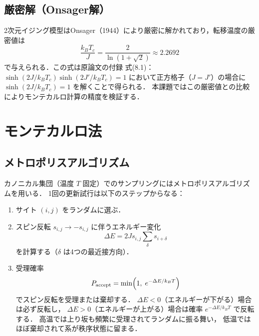 \documentclass[12pt,a4paper]{ltjsarticle}
\begin{document}
\subsection{厳密解（Onsager解）}

2次元イジング模型はOnsager（1944）により厳密に解かれており，転移温度の厳密値は
\begin{equation}
  \frac{k_B T_c}{J} = \frac{2}{\ln(1+\sqrt{2})} \approx 2.2692
  \label{eq:onsager}
\end{equation}
で与えられる．この式は原論文の付録 式(8.1)：$\sinh(2J/k_BT_c)\sinh(2J'/k_BT_c)=1$
において正方格子（$J=J'$）の場合に $\sinh(2J/k_BT_c)=1$ を解くことで得られる．
本課題ではこの厳密値との比較によりモンテカルロ計算の精度を検証する．

\section{モンテカルロ法}

\subsection{メトロポリスアルゴリズム}

カノニカル集団（温度 $T$ 固定）でのサンプリングにはメトロポリスアルゴリズムを用いる．
1回の更新試行は以下のステップからなる：

\begin{enumerate}
  \item サイト $(i,j)$ をランダムに選ぶ．
  \item スピン反転 $s_{i,j} \to -s_{i,j}$ に伴うエネルギー変化
        \begin{equation}
          \Delta E = 2 J s_{i,j} \sum_{\delta} s_{i+\delta}
        \end{equation}
        を計算する（$\delta$ は4つの最近接方向）．
  \item 受理確率
        \begin{equation}
          P_{\rm accept} = \min\!\left(1,\; e^{-\Delta E / k_B T}\right)
        \end{equation}
        でスピン反転を受理または棄却する．
        $\Delta E < 0$（エネルギーが下がる）場合は必ず反転し，
        $\Delta E > 0$（エネルギーが上がる）場合は確率 $e^{-\Delta E/k_BT}$ で反転する．
        高温では上り坂も頻繁に受理されてランダムに振る舞い，
        低温ではほぼ棄却されて系が秩序状態に留まる．
\end{enumerate}
\end{document}
